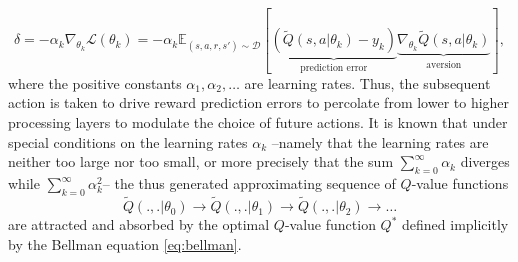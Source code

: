 \documentclass[10pt,letterpaper]{article}
\begin{document}

\begin{equation}
  \delta= -\alpha_k \nabla_{\theta_{k}}\mathcal L(\theta_{k})
  = -\alpha_k\mathbb E_{(s, a, r, s') \sim \mathcal D}[\underbrace{(\tilde{Q}(s, a|\theta_{k}) - y_k)}_{\text{prediction error}}
    \underbrace{\nabla_{\theta_{k}}\tilde{Q}(s, a|\theta_{k})}_{\text{aversion}}],
  \label{eq:oracle}
\end{equation}
where the positive constants $\alpha_1, \alpha_2,\ldots$ are learning rates.
Thus, the subsequent action is taken to drive reward prediction errors
to percolate from lower to higher processing layers to modulate the
choice of future actions. It is known that under special conditions on the learning rates $\alpha_k$ --namely that the learning rates are neither too large nor too small, or more precisely that the sum $\sum_{k=0}^\infty\alpha_k$ diverges while $\sum_{k=0}^\infty\alpha_k^2$--
the thus generated approximating sequence of $Q$-value functions
$$\tilde{Q}(.,.|\theta_0) \rightarrow \tilde{Q}(.,.|\theta_1) \rightarrow \tilde{Q}(.,.|\theta_2) \rightarrow \ldots$$
are attracted and absorbed by the optimal $Q$-value function $Q^*$ defined implicitly by the Bellman equation \eqref{eq:bellman}.

\end{document}
